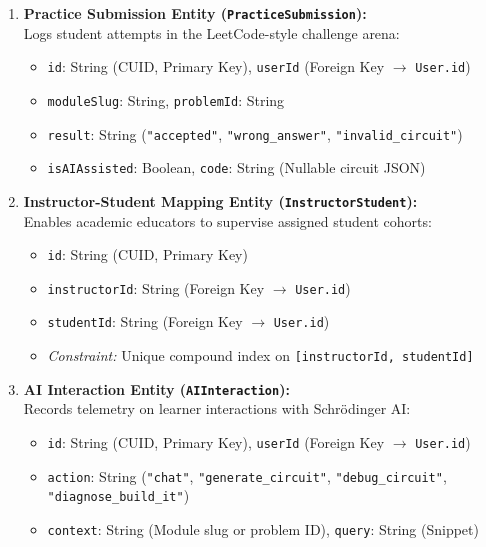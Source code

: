 \documentclass[11pt, a4paper]{article}
\begin{document}
\begin{enumerate}[label=\textbf{\arabic*.}, itemsep=4pt, parsep=2pt]
	\item \textbf{Practice Submission Entity (\texttt{PracticeSubmission}):}\\
	Logs student attempts in the LeetCode-style challenge arena:
	\begin{itemize}[noitemsep, topsep=2pt]
		\item \texttt{id}: String (CUID, Primary Key), \texttt{userId} (Foreign Key $\to$ \texttt{User.id})
		\item \texttt{moduleSlug}: String, \texttt{problemId}: String
		\item \texttt{result}: String (\texttt{"accepted"}, \texttt{"wrong\_answer"}, \texttt{"invalid\_circuit"})
		\item \texttt{isAIAssisted}: Boolean, \texttt{code}: String (Nullable circuit JSON)
	\end{itemize}

	\item \textbf{Instructor-Student Mapping Entity (\texttt{InstructorStudent}):}\\
	Enables academic educators to supervise assigned student cohorts:
	\begin{itemize}[noitemsep, topsep=2pt]
		\item \texttt{id}: String (CUID, Primary Key)
		\item \texttt{instructorId}: String (Foreign Key $\to$ \texttt{User.id})
		\item \texttt{studentId}: String (Foreign Key $\to$ \texttt{User.id})
		\item \textit{Constraint:} Unique compound index on \texttt{[instructorId, studentId]}
	\end{itemize}

	\item \textbf{AI Interaction Entity (\texttt{AIInteraction}):}\\
	Records telemetry on learner interactions with Schr{\"o}dinger AI:
	\begin{itemize}[noitemsep, topsep=2pt]
		\item \texttt{id}: String (CUID, Primary Key), \texttt{userId} (Foreign Key $\to$ \texttt{User.id})
		\item \texttt{action}: String (\texttt{"chat"}, \texttt{"generate\_circuit"}, \texttt{"debug\_circuit"}, \texttt{"diagnose\_build\_it"})
		\item \texttt{context}: String (Module slug or problem ID), \texttt{query}: String (Snippet)
	\end{itemize}
\end{enumerate}
\end{document}
